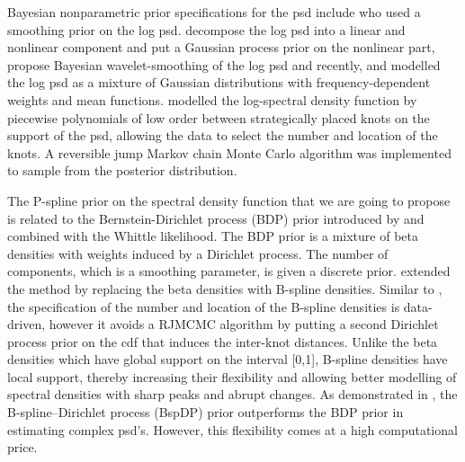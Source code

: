 \documentclass[twocolumn,final]{svjour3}
\begin{document}
Bayesian nonparametric prior specifications for the psd include \cite{Cart:1997}
who used a smoothing prior on the log psd.  \cite{Rosen:2012} decompose the log psd into a linear and nonlinear component and  put a Gaussian process prior on the nonlinear part, \cite{Pensky:2007} propose Bayesian wavelet-smoothing of the log psd and recently, and \cite{Cadonna2017} modelled the log psd  as a mixture of Gaussian distributions with frequency-dependent weights and mean functions.
%
\cite{Gangopadhyay:1999} modelled the log-spectral density function by  piecewise polynomials of low order between strategically placed knots on the support of the psd,  allowing the data to select the number and location of the knots.  A reversible jump Markov chain Monte Carlo \citep[RJMCMC;][]{Green:1995} algorithm was implemented to sample from the posterior distribution.

The P-spline prior on the spectral density function that we are going to propose is related to the 
Bernstein-Dirichlet process (BDP) prior  introduced by \cite{Choudhuri:2004} and combined with the Whittle likelihood.  The BDP prior  is a mixture of beta densities with weights induced by a Dirichlet process.  The number of components, which is a smoothing parameter, is given a discrete prior.  \cite{Edwards2018} extended the method by replacing the beta densities with B-spline densities. Similar to 
\cite{Gangopadhyay:1999}, the specification of the number and location of the B-spline densities is data-driven, however it avoids a RJMCMC algorithm by putting a second Dirichlet process prior  on the cdf that induces the inter-knot distances. 
Unlike the beta densities  which have global support on the interval [0,1], B-spline densities have local support, thereby increasing their flexibility and allowing better modelling of spectral densities with sharp peaks and abrupt changes.  As demonstrated in \citep{Edwards2018}, the B-spline--Dirichlet process (BspDP) prior outperforms the BDP prior in estimating complex psd's.  However, this flexibility comes at a high computational price.

\end{document}
